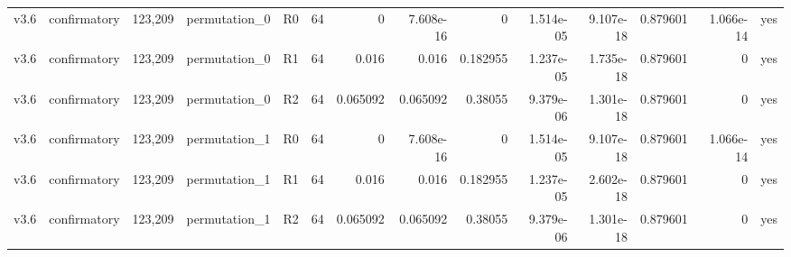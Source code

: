 \begin{table}[!htbp]
{\begin{tabular}{lrrrrrrrrrrrrr}
v3.6 & confirmatory & 123,209 & permutation\_0 & R0 & 64 & 0 & 7.608e-16 & 0 & 1.514e-05 & 9.107e-18 & 0.879601 & 1.066e-14 & yes \\
v3.6 & confirmatory & 123,209 & permutation\_0 & R1 & 64 & 0.016 & 0.016 & 0.182955 & 1.237e-05 & 1.735e-18 & 0.879601 & 0 & yes \\
v3.6 & confirmatory & 123,209 & permutation\_0 & R2 & 64 & 0.065092 & 0.065092 & 0.38055 & 9.379e-06 & 1.301e-18 & 0.879601 & 0 & yes \\
v3.6 & confirmatory & 123,209 & permutation\_1 & R0 & 64 & 0 & 7.608e-16 & 0 & 1.514e-05 & 9.107e-18 & 0.879601 & 1.066e-14 & yes \\
v3.6 & confirmatory & 123,209 & permutation\_1 & R1 & 64 & 0.016 & 0.016 & 0.182955 & 1.237e-05 & 2.602e-18 & 0.879601 & 0 & yes \\
v3.6 & confirmatory & 123,209 & permutation\_1 & R2 & 64 & 0.065092 & 0.065092 & 0.38055 & 9.379e-06 & 1.301e-18 & 0.879601 & 0 & yes \\
\bottomrule
\end{tabular}%
}
\end{table}
